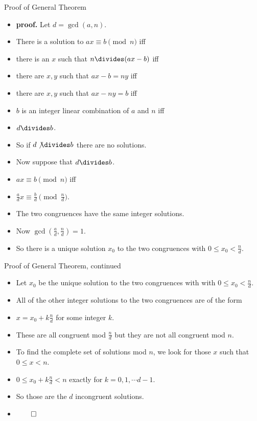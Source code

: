 \documentclass{beamer}
\begin{document}
\begin{frame}{Proof of General Theorem}
\begin{itemize}
  \item \textbf{proof.} Let $d=\gcd(a,n)$.
  \item There is a solution to $ax\equiv b \pmod n$ iff
  \item there is an $x$ such that $n\divides (ax - b)$ iff
  \item there are $x,y$ such that $ax-b = ny$ iff
  \item there are $x,y$ such that $ax - ny = b$ iff
  \item $b$ is an integer linear combination of $a$ and $n$ iff
  \item $d\divides b$.
  \item So if $d\not\divides b$ there are no solutions.
  \item Now suppose that $d\divides b$.
  \item $ax\equiv b \pmod n$ iff
  \item $\frac{a}{d}x \equiv \frac{b}{d} \pmod {\frac{n}{d}}$.
  \item The two congruences have the same integer solutions.
  \item Now $\gcd(\frac{a}{d},\frac{n}{d}) = 1$.
  \item So there is a unique solution $x_0$ to the two congruences with
  $0\leq x_0 < \frac{n}{d}$.
\end{itemize}
\end{frame}

\begin{frame}{Proof of General Theorem, continued}
\begin{itemize}
  \item Let $x_0$ be the unique solution to the two congruences with
 with $0\leq x_0 < \frac{n}{d}$.
  \item All of the other integer solutions to the two congruences are of the form
  \item $x=x_0+k\frac{n}{d}$ for some integer $k$.
  \item These are all congruent mod $\frac{n}{d}$ but they are not all congruent mod $n$.
  \item To find the complete set of solutions mod $n$, we look for those $x$ such that $0\leq x < n$.
  \item $0\leq x_0+k\frac{n}{d} < n$ exactly for $k=0,1,\cdots d-1$.
  \item So those are the $d$ incongruent solutions.
  \item $\qed$
\end{itemize}
\end{frame}
\end{document}
